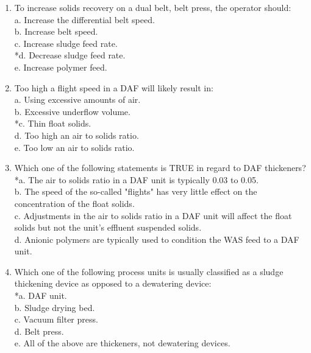 \begin{enumerate}
\item  To increase solids recovery on a dual belt, belt press, the operator should: \\

a. Increase the differential belt speed. \\
b. Increase belt speed. \\
c. Increase sludge feed rate. \\
*d. Decrease sludge feed rate. \\
e. Increase polymer feed. \\

\item  Too high a flight speed in a DAF will likely result in: \\

a. Using excessive amounts of air. \\
b. Excessive underflow volume. \\
*c. Thin float solids. \\
d. Too high an air to solids ratio. \\
e. Too low an air to solids ratio. \\

\item  Which one of the following statements is TRUE in regard to DAF thickeners? \\

*a. The air to solids ratio in a DAF unit is typically 0.03 to 0.05. \\
b. The speed of the so-called "flights" has very little effect on the concentration of the float solids. \\
c. Adjustments in the air to solids ratio in a DAF unit will affect the float solids but not the unit's effluent suspended solids. \\
d. Anionic polymers are typically used to condition the WAS feed to a DAF unit. \\

\item  Which one of the following process units is usually classified as a sludge thickening device as opposed to a dewatering device: \\

*a. DAF unit. \\
b. Sludge drying bed. \\
c. Vacuum filter press. \\
d. Belt press. \\
e. All of the above are thickeners, not dewatering devices. \\


\end{enumerate}
